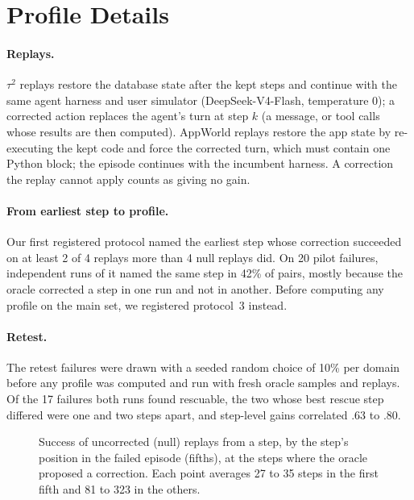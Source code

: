 \documentclass[11pt]{article}
\begin{document}


\appendix

\section{Profile Details}
\label{app:gt}

\paragraph{Replays.} $\tau^2$ replays restore the database state after the kept steps and continue with the same agent harness and user simulator (DeepSeek-V4-Flash, temperature 0); a corrected action replaces the agent's turn at step $k$ (a message, or tool calls whose results are then computed). AppWorld replays restore the app state by re-executing the kept code and force the corrected turn, which must contain one Python block; the episode continues with the incumbent harness. A correction the replay cannot apply counts as giving no gain.

\paragraph{From earliest step to profile.} Our first registered protocol named the earliest step whose correction succeeded on at least 2 of 4 replays more than 4 null replays did. On 20 pilot failures, independent runs of it named the same step in 42\% of pairs, mostly because the oracle corrected a step in one run and not in another. Before computing any profile on the main set, we registered protocol~3 instead.

\paragraph{Retest.} The retest failures were drawn with a seeded random choice of 10\% per domain before any profile was computed and run with fresh oracle samples and replays. Of the 17 failures both runs found rescuable, the two whose best rescue step differed were one and two steps apart, and step-level gains correlated .63 to .80.

\begin{figure}[t]
\centering
{}
\caption{Success of uncorrected (null) replays from a step, by the step's position in the failed episode (fifths), at the steps where the oracle proposed a correction. Each point averages 27 to 35 steps in the first fifth and 81 to 323 in the others.}
\label{fig:nullpos}
\end{figure}
\end{document}
